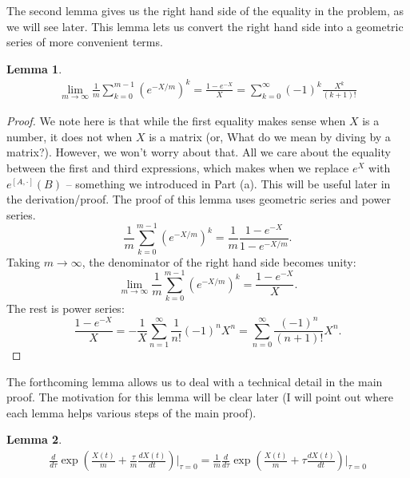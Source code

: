 \documentclass{article}
\theoremstyle{definition}
\newtheorem{lemma}{Lemma}
\newcommand{\f}[2]{\frac{#1}{#2}}
\newcommand{\lp}{\left(}
\newcommand{\rp}{\right)}
\begin{document}
\begin{enumerate}[label=(\alph*)]
	The second lemma gives us the right hand side of the equality in the problem, as we will see later. This lemma lets us convert the right hand side into a geometric series of more convenient terms. 
	\begin{lemma}\label{lem:2}
		\begin{align*}
		\lim_{m\to \infty} \f{1}{m} \sum^{m-1}_{k=0} \lp e^{-X/m} \rp^k = \f{1-e^{-X}}{X} = \sum^\infty_{k=0} (-1)^k \f{X^k}{(k+1)!}
		\end{align*}
	\end{lemma}
	\begin{proof}
		We note here is that while the first equality makes sense when $X$ is a number, it does not when $X$ is a matrix (or, What do we mean by diving by a matrix?). However, we won't worry about that. All we care about the equality between the first and third expressions, which makes when we replace $e^X$ with $e^{[A,\cdot]}(B)$ -- something we introduced in Part (a). This will be useful later in the derivation/proof. The proof of this lemma uses geometric series and power series. 
		\begin{equation*}
		\f{1}{m}\sum^{m-1}_{k=0} \lp e^{-X/m} \rp^k = \f{1}{m}  \f{1-e^{-X}}{1-e^{-X/m}}. 
		\end{equation*}
		Taking $m\to \infty$, the denominator of the right hand side becomes unity: 
		\begin{equation*}
		\lim_{m\to \infty} \f{1}{m} \sum^{m-1}_{k=0} \lp e^{-X/m} \rp^k = \f{1-e^{-X}}{X}.
		\end{equation*}
		The rest is power series:
		\begin{equation*}
		\f{1-e^{-X}}{X} = -\f{1}{X} \sum^\infty_{n=1} \f{1}{n!}(-1)^nX^n = \sum^\infty_{n=0} \f{(-1)^{n}}{(n+1)!}X^{n}.
		\end{equation*}
	\end{proof}
	The forthcoming lemma allows us to deal with a technical detail in the main proof. The motivation for this lemma will be clear later (I will point out where each lemma helps various steps of the main proof). 
	\begin{lemma}\label{lem:3}
		\begin{align*}
		\f{d}{d\tau} \exp\lp \f{X(t)}{m} + \f{\tau}{m} \f{dX(t)}{dt}\rp \bigg\vert_{\tau = 0} = \f{1}{m} \f{d}{d\tau} \exp\lp \f{X(t)}{m} + \tau \f{dX(t)}{dt}\rp \bigg\vert_{\tau = 0} 
		\end{align*}
	\end{lemma}


\end{enumerate}
\end{document}
